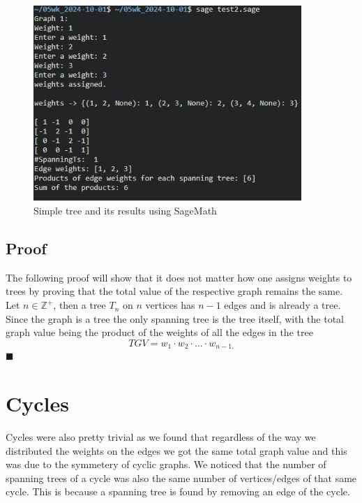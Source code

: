 \documentclass[12pt,letterpaper]{article}
\begin{document}
	\begin{figure}[hbt!]  
		\begin{center}
		\includegraphics[width=4in]{f1.1.jpg}
		\end{center}
		\caption{\label{OrBx} Simple tree and its results using SageMath}
	\end{figure}
	

  
\subsection{Proof}
The following proof will show that it does not matter how one assigns weights to trees by proving that the total value of the respective graph remains the same.\\

Let $n\in\mathbb{Z}^{+}$, then a tree $T_{n}$ on $n$ vertices has $n-1$ edges and is already a tree. Since the graph is a tree the only spanning tree is the tree itself, with the total graph value being the product of the weights of all the edges in the tree $$TGV=w_{1}\cdot w_{2}\cdot\ldots\cdot w_{n-1.}$$
$\blacksquare$\\

\section{Cycles} \label{C}
Cycles were also pretty trivial as we found that regardless of the way we distributed the weights on the edges we got the same total graph value and this was due to the symmetery of cyclic graphs. We noticed that the number of spanning trees of a cycle was also the same number of vertices/edges of that same cycle. This is because a spanning tree is found by removing an edge of the cycle.
\end{document}
